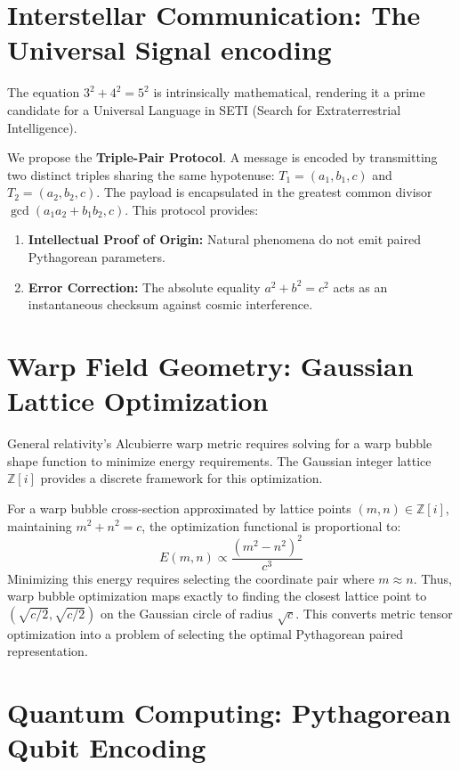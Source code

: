 \documentclass[12pt,a4paper]{article}
\begin{document}
\section{Interstellar Communication: The Universal Signal encoding}

The equation $3^2 + 4^2 = 5^2$ is intrinsically mathematical, rendering it a prime candidate for a Universal Language in SETI (Search for Extraterrestrial Intelligence).

We propose the \textbf{Triple-Pair Protocol}. A message is encoded by transmitting two distinct triples sharing the same hypotenuse: $T_1 = (a_1, b_1, c)$ and $T_2 = (a_2, b_2, c)$. The payload is encapsulated in the greatest common divisor $\gcd(a_1 a_2 + b_1 b_2, c)$.
This protocol provides:
\begin{enumerate}
    \item \textbf{Intellectual Proof of Origin:} Natural phenomena do not emit paired Pythagorean parameters.
    \item \textbf{Error Correction:} The absolute equality $a^2 + b^2 = c^2$ acts as an instantaneous checksum against cosmic interference.
\end{enumerate}

\section{Warp Field Geometry: Gaussian Lattice Optimization}

General relativity's Alcubierre warp metric requires solving for a warp bubble shape function to minimize energy requirements. The Gaussian integer lattice $\mathbb{Z}[i]$ provides a discrete framework for this optimization.

For a warp bubble cross-section approximated by lattice points $(m, n) \in \mathbb{Z}[i]$, maintaining $m^2 + n^2 = c$, the optimization functional is proportional to:
\[ E(m, n) \propto \frac{(m^2 - n^2)^2}{c^3} \]
Minimizing this energy requires selecting the coordinate pair where $m \approx n$. Thus, warp bubble optimization maps exactly to finding the closest lattice point to $(\sqrt{c/2}, \sqrt{c/2})$ on the Gaussian circle of radius $\sqrt{c}$. This converts metric tensor optimization into a problem of selecting the optimal Pythagorean paired representation.

\section{Quantum Computing: Pythagorean Qubit Encoding}
\end{document}
